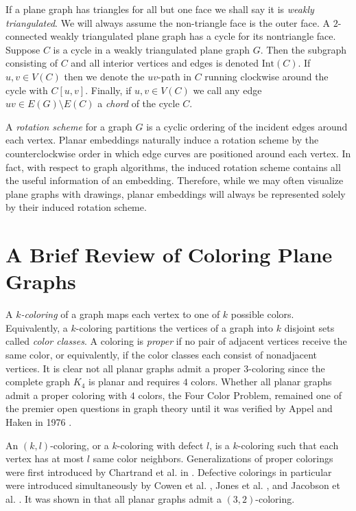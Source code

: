 \documentclass[letterpaper, 12pt]{amsart}
\theoremstyle{definition}
\theoremstyle{definition}
\theoremstyle{thm}
\theoremstyle{definition}
\begin{document}
If a plane graph has triangles for all but one face we shall say it is
\textit{weakly triangulated}. We will always assume the non-triangle face is the
outer face. A $2$-connected weakly triangulated plane graph has a cycle for its
nontriangle face. Suppose $C$ is a cycle in a weakly
triangulated plane graph $G$. Then the subgraph consisting of $C$ and all interior
vertices and edges is denoted $\text{Int}(C)$. If $u,v \in V(C)$ then we denote
the $uv$-path in $C$ running clockwise around the cycle with $C[u,v]$. Finally,
if $u,v\in V(C)$ we call any edge $uv \in E(G)\setminus E(C)$ a \textit{chord} of
the cycle $C$.

A \textit{rotation scheme} for a graph $G$ is a cyclic ordering of the incident
edges around each vertex. Planar embeddings naturally induce a rotation
scheme by the counterclockwise order in which edge curves are positioned around
each vertex. In fact, with respect to graph algorithms, the induced rotation
scheme contains all the useful information of an embedding. Therefore, while we
may often visualize plane graphs with drawings, planar embeddings will always be
represented solely by their induced rotation scheme.

\section{A Brief Review of Coloring Plane Graphs}

A $k$\textit{-coloring} of a graph maps each vertex to one of $k$ possible
colors. Equivalently, a $k$-coloring partitions the vertices of a graph into $k$
disjoint sets called \textit{color classes}. 
A coloring is \textit{proper} if no pair of adjacent vertices receive the same
color, or equivalently, if the color classes each consist of nonadjacent vertices. It
is clear not all planar graphs admit a proper $3$-coloring since the complete
graph $K_4$ is planar
and requires $4$ colors. Whether all planar graphs admit a proper coloring with
$4$ colors, the Four Color Problem, remained one of the premier open questions
in graph theory until it was verified by Appel and Haken in 1976
\cite{appel1, appel2}.

An $(k,l)$-coloring, or a $k$-coloring with defect $l$, is a
$k$-coloring such that each vertex has at most $l$ same color neighbors.
Generalizations of proper colorings were first introduced by Chartrand et al. in
\cite{chartrand}. Defective colorings in particular were introduced
simultaneously by Cowen et al. \cite{cowen}, Jones et al. \cite{jones}, and
Jacobson et al. \cite{jacobson}. It was shown in \cite{cowen} that all
planar graphs admit a $(3,2)$-coloring.
\end{document}
